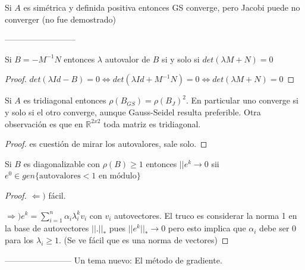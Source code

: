 \documentclass[10pt,a4paper,final]{report}
\begin{document}

\begin{theorem}

 Si $A$ es simétrica y definida positiva entonces GS converge, pero Jacobi puede no converger (no fue demostrado)
\end{theorem}
--------------------------

\begin{proposition}Si $B=-M^{-1}N$ entonces $\lambda$ autovalor de $B$ si y solo si $det(\lambda M + N) = 0$
\end{proposition}

\begin{proof}

$det(\lambda Id - B) = 0 \Leftrightarrow det(\lambda Id + M^{-1}N ) = 0 \Leftrightarrow det(\lambda M + N) = 0$
\end{proof}

\begin{proposition}Si $A$ es tridiagonal entonces $\rho(B_{GS}) = \rho(B_J)^2$. En particular uno converge si y solo si el otro converge, aunque Gauss-Seidel resulta preferible. Otra observación es que en $\mathbb{R}^{2x2}$ toda matriz es tridiagonal.
\end{proposition}

\begin{proof}es cuestión de mirar los autovalores, sale solo.
\end{proof}


\begin{proposition}Si $B$ es diagonalizable con $\rho(B) \geq 1$ entonces $||e^k \to 0$ sii $e^0 \in gen\{\text{autovalores} < \text{1 en módulo} \}$
\end{proposition}
\begin{proof}

$\Leftarrow)$ fácil.

$\Rightarrow) e^k = \sum_{i=1}^n \alpha_i \lambda_i^k v_i$ con $v_i$ autovectores. El truco es considerar la norma 1 en la base de autovectores $||.||_*$ pues $||e^k||_* \to 0$ pero esto implica que $\alpha_i$ debe ser 0 para los $\lambda_i \geq 1$. (Se ve fácil que es una norma de vectores)

\end{proof}

\bigskip





------------------------
Un tema nuevo: El método de gradiente.
\end{document}
